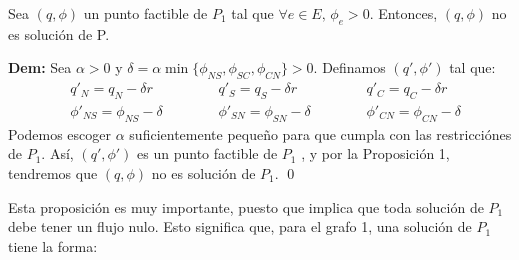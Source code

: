 \documentclass[12pt,twoside]{article}
\newenvironment{proposicion}[2][\(\blacksquare\) Proposici\'on]{\begin{trivlist}
		\item[\hskip \labelsep {\bfseries #1}\hskip \labelsep {\bfseries #2.}]}{\end{trivlist}}
\begin{document}
	\begin{proposicion}{3} Sea \((q,\phi)\) un punto factible de \(P_1\) tal que \(\forall e \in E,\, \phi_e>0\). Entonces, \((q,\phi)\) no es soluci\'on de P.
		
		\textbf{Dem:} Sea \(\alpha>0\) y \(\delta=\alpha\min\{\phi_{NS},\phi_{SC},\phi_{CN}\}>0\). Definamos \((q',\phi')\) tal que:
		\begin{equation*}
			\begin{aligned}
				&  q'_N=q_N-\delta r  & \hspace{1cm} &  q'_S=q_S-\delta r & \hspace{1cm} &  q'_C=q_C-\delta r \\
				& \phi'_{NS}=\phi_{NS}-\delta & \hspace{1cm} & \phi'_{SN}=\phi_{SN}-\delta & \hspace{1cm} & \phi'_{CN}=\phi_{CN}-\delta
			\end{aligned}
		\end{equation*}
		Podemos escoger \(\alpha\) suficientemente peque\~{n}o para que cumpla con las restricci\'ones de \(P_1\). As\'i, \((q',\phi')\) es un punto factible de \(P_1\) , y por la Proposici\'on 1, tendremos que \((q,\phi)\) no es soluci\'on de \(P_1\). \qed
	\end{proposicion}
	
	\hspace{1cm}Esta proposici\'on es muy importante, puesto que implica que toda soluci\'on de \(P_1\) debe tener un flujo nulo. Esto significa que, para el grafo 1, una soluci\'on de \(P_1\) tiene la forma:
	
	\vspace{0.4cm}
	\begin{center}
	\end{center}
	
\end{document}
